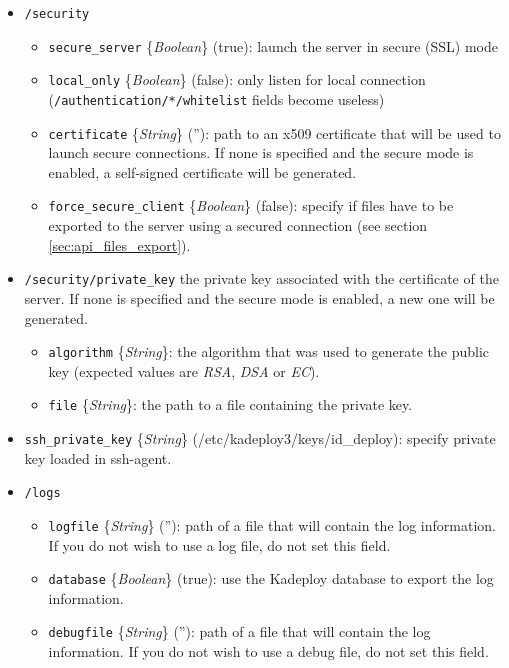 \documentclass[a4wide,10pt,oneside]{book}
\newcommand{\ypath}[1]{\texttt{#1}}
\newcommand{\yfield}[2]{\texttt{#1} {\small\{{\emph{#2}}\}}:}
\newcommand{\yfieldd}[3]{\texttt{#1} {\small\{{\emph{#2}}\}} {\small(}#3{\small)}:}
\begin{document}
\begin{itemize}
  \item \ypath{/security}
  \begin{itemize}
    \item \yfieldd{secure\_server}{Boolean}{true} launch the server in secure (SSL) mode
    \item \yfieldd{local\_only}{Boolean}{false} only listen for local connection (\ypath{/authentication/*/whitelist} fields become useless)
    \item \yfieldd{certificate}{String}{''} path to an x509 certificate that will be used to launch secure connections. If none is specified and the secure mode is enabled, a self-signed certificate will be generated.
    \item \yfieldd{force\_secure\_client}{Boolean}{false} specify if files have to be exported to the server using a secured connection (see section \ref{sec:api_files_export}).
  \end{itemize}
  \item \ypath{/security/private\_key} the private key associated with the certificate of the server. If none is specified and the secure mode is enabled, a new one will be generated.
  \begin{itemize}
    \item \yfield{algorithm}{String} the algorithm that was used to generate the public key (expected values are \emph{RSA}, \emph{DSA} or \emph{EC}).
    \item \yfield{file}{String} the path to a file containing the private key.
  \end{itemize}

  \item \yfieldd{ssh\_private\_key}{String}{/etc/kadeploy3/keys/id\_deploy} specify private key loaded in ssh-agent.

  \item \ypath{/logs}
  \begin{itemize}
    \item \yfieldd{logfile}{String}{''} path of a file that will contain the log information. If you do not wish to use a log file, do not set this field.
    \item \yfieldd{database}{Boolean}{true} use the Kadeploy database to export the log information.
    \item \yfieldd{debugfile}{String}{''} path of a file that will contain the log information. If you do not wish to use a debug file, do not set this field.
  \end{itemize}


\end{itemize}
\end{document}
